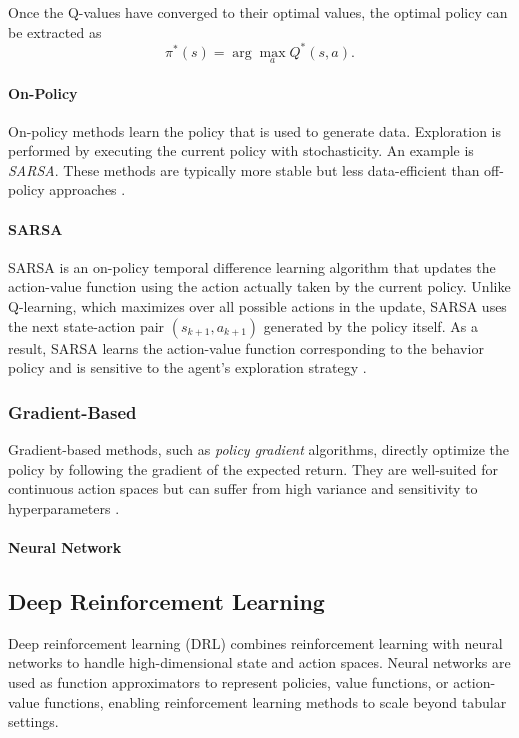 Once the Q-values have converged to their optimal values, the optimal policy can be extracted as
\[
\pi^\ast(s) = \arg\max_{a} Q^\ast(s,a).
\]


\paragraph{On-Policy}
On-policy methods learn the policy that is used to generate data. Exploration is performed by executing the current policy with stochasticity. An example is \emph{SARSA}. These methods are typically more stable but less data-efficient than off-policy approaches \cite{brunton2022data}.

\paragraph{SARSA}
SARSA is an on-policy temporal difference learning algorithm that updates the action-value function using the action actually taken by the current policy. Unlike Q-learning, which maximizes over all possible actions in the update, SARSA uses the next state-action pair \( (s_{k+1}, a_{k+1}) \) generated by the policy itself. As a result, SARSA learns the action-value function corresponding to the behavior policy and is sensitive to the agent’s exploration strategy \cite{brunton2022data}.


\subsubsection{Gradient-Based}
Gradient-based methods, such as \emph{policy gradient} algorithms, directly optimize the policy by following the gradient of the expected return. They are well-suited for continuous action spaces but can suffer from high variance and sensitivity to hyperparameters \cite{brunton2022data}.

\paragraph{Neural Network}



\subsection{Deep Reinforcement Learning}

Deep reinforcement learning (DRL) combines reinforcement learning with neural networks to handle high-dimensional state and action spaces. Neural networks are used as function approximators to represent policies, value functions, or action-value functions, enabling reinforcement learning methods to scale beyond tabular settings.

